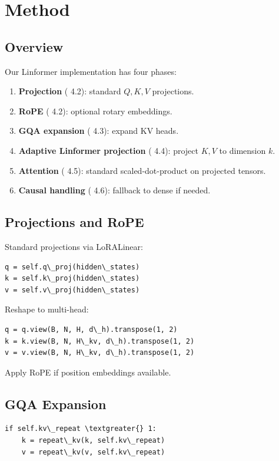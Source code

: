 \section{Method}

\subsection{Overview}

Our Linformer implementation has four phases:

\begin{enumerate}
\item \textbf{Projection} ( 4.2): standard $Q, K, V$ projections.
\item \textbf{RoPE} ( 4.2): optional rotary embeddings.
\item \textbf{GQA expansion} ( 4.3): expand KV heads.
\item \textbf{Adaptive Linformer projection} ( 4.4): project $K, V$ to dimension $k$.
\item \textbf{Attention} ( 4.5): standard scaled-dot-product on projected tensors.
\item \textbf{Causal handling} ( 4.6): fallback to dense if needed.

\end{enumerate}
\subsection{Projections and RoPE}

Standard projections via LoRALinear:

\begin{lstlisting}
q = self.q\_proj(hidden\_states)
k = self.k\_proj(hidden\_states)
v = self.v\_proj(hidden\_states)
\end{lstlisting}

Reshape to multi-head:

\begin{lstlisting}
q = q.view(B, N, H, d\_h).transpose(1, 2)
k = k.view(B, N, H\_kv, d\_h).transpose(1, 2)
v = v.view(B, N, H\_kv, d\_h).transpose(1, 2)
\end{lstlisting}

Apply RoPE if position embeddings available.

\subsection{GQA Expansion}

\begin{lstlisting}
if self.kv\_repeat \textgreater{} 1:
    k = repeat\_kv(k, self.kv\_repeat)
    v = repeat\_kv(v, self.kv\_repeat)
\end{lstlisting}

